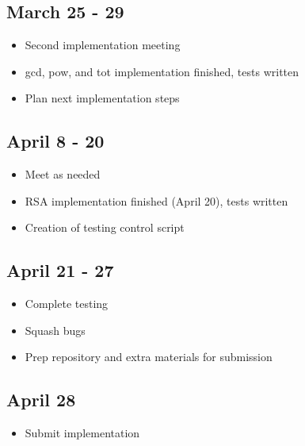 \documentclass{article}
\begin{document}
    \subsection{March 25 - 29}
         \begin{itemize}
            \item Second implementation meeting
            \item gcd, pow, and tot implementation finished, tests written
            \item Plan next implementation steps
        \end{itemize}
    \subsection{April 8 - 20}
        \begin{itemize}
            \item Meet as needed
            \item RSA implementation finished (April 20), tests written
            \item Creation of testing control script
        \end{itemize}
    \subsection{April 21 - 27}
        \begin{itemize}
            \item Complete testing
            \item Squash bugs
            \item Prep repository and extra materials for submission
        \end{itemize}
    \subsection{April 28}
        \begin{itemize}
            \item Submit implementation
        \end{itemize}
\newpage
\end{document}

